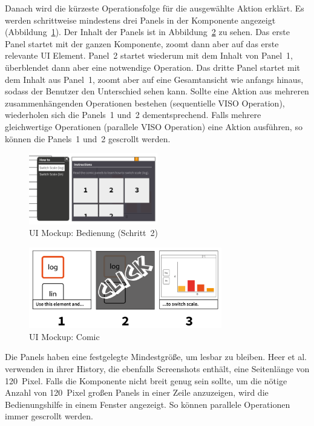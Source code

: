 \documentclass[
	headsepline,
	footsepline,
	fontsize=12pt,
	bibliography=totoc
]{scrbook}
\begin{document}
Danach wird die kürzeste Operationsfolge für die ausgewählte Aktion erklärt. Es werden schrittweise mindestens drei Panels in der Komponente angezeigt (Abbildung~\ref{figure:bedienung-step2}). Der Inhalt der Panels ist in Abbildung~\ref{figure:bedienung-comic} zu sehen. Das erste Panel startet mit der ganzen Komponente, zoomt dann aber auf das erste relevante UI Element. Panel~2 startet wiederum mit dem Inhalt von Panel~1, überblendet dann aber eine notwendige Operation. Das dritte Panel startet mit dem Inhalt aus Panel~1, zoomt aber auf eine Gesamtansicht wie anfangs hinaus, sodass der Benutzer den Unterschied sehen kann. Sollte eine Aktion aus mehreren zusammenhängenden Operationen bestehen (sequentielle VISO Operation), wiederholen sich die Panels~1 und~2 dementsprechend. Falls mehrere gleichwertige Operationen (parallele VISO Operation) eine Aktion ausführen, so können die Panels~1 und~2 gescrollt werden.

\begin{figure}[htbp]
   \centering
   \includegraphics[width=0.5\textwidth]{images/konzeption-bedienung-step2.png}
   \caption{UI Mockup: Bedienung (Schritt~2)}
   \label{figure:bedienung-step2}
\end{figure}

\begin{figure}[htbp]
   \centering
   \includegraphics[width=0.75\textwidth]{images/konzeption-bedienung-comic.png}
   \caption{UI Mockup: Comic}
   \label{figure:bedienung-comic}
\end{figure}

Die Panels haben eine festgelegte Mindestgröße, um lesbar zu bleiben. Heer et al. \cite{Heer2008} verwenden in ihrer History, die ebenfalls Screenshots enthält, eine Seitenlänge von 120~Pixel. Falls die Komponente nicht breit genug sein sollte, um die nötige Anzahl von 120~Pixel großen Panels in einer Zeile anzuzeigen, wird die Bedienungshilfe in einem Fenster angezeigt. So können parallele Operationen immer gescrollt werden.
\end{document}
